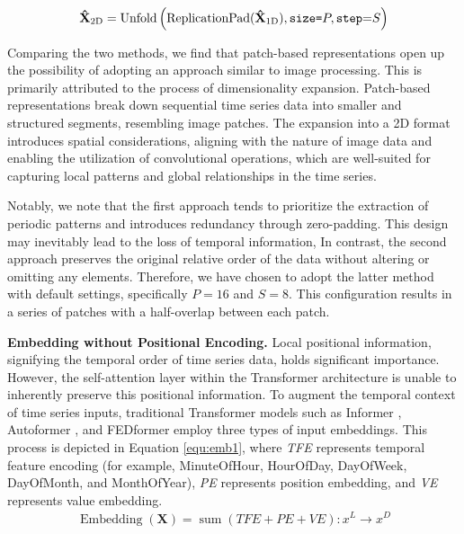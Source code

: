 \documentclass{article} \usepackage{iclr2024_conference,times}
\begin{document}
\begin{itemize}
\begin{equation}\label{equ:unfold}
  \begin{split}
\mathbf{\hat{X}}_{\text{2D}} &= \operatorname{Unfold}\left(\operatorname{ReplicationPad}(\mathbf{\hat{X}}_{\text{1D}}), \text{\texttt{size=}}P, \text{\texttt{step}=}S\right)\\
  \end{split}
\end{equation}
\end{itemize}



Comparing the two methods, we find that patch-based representations open up the possibility of adopting an approach similar to image processing. This is primarily attributed to the process of dimensionality expansion. Patch-based representations break down sequential time series data into smaller and structured segments, resembling image patches. The expansion into a 2D format introduces spatial considerations, aligning with the nature of image data and enabling the utilization of convolutional operations, which are well-suited for capturing local patterns and global relationships in the time series. 

Notably, we note that the first approach tends to prioritize the extraction of periodic patterns and introduces redundancy through zero-padding. This design may inevitably lead to the loss of temporal information, In contrast, the second approach preserves the original relative order of the data without altering or omitting any elements. Therefore, we have chosen to adopt the latter method with default settings, specifically $P = 16$ and $S = 8$. This configuration results in a series of patches with a half-overlap between each patch.
 




\noindent \textbf{Embedding without Positional Encoding.}  Local positional information, signifying the temporal order of time series data, holds significant importance. However, the self-attention layer within the Transformer architecture is unable to inherently preserve this positional information. To augment the temporal context of time series inputs, traditional Transformer models such as Informer \citep{informer}, Autoformer \citep{autoformer}, and FEDformer \citep{fedformer} employ three types of input embeddings. This process is depicted in Equation \ref{equ:emb1}, where \textit{TFE} represents temporal feature encoding (for example, MinuteOfHour, HourOfDay, DayOfWeek, DayOfMonth, and MonthOfYear), \textit{PE} represents position embedding, and \textit{VE} represents value embedding.
 \begin{equation}\label{equ:emb1}
  \begin{split}
\operatorname{Embedding}(\mathbf{X})=\operatorname{sum}(TFE + PE +VE): x^{L} \rightarrow x^{D}\\
  \end{split}
\end{equation}
 
\end{document}
